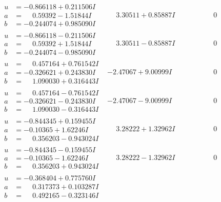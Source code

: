 \documentclass[1p]{elsarticle_modified}
\theoremstyle{definition}
\begin{document}
$$\begin{array}{c|c|c}
\begin{aligned}
u &= -0.866118 + 0.211506 I \\
a &= \phantom{-}0.59392 - 1.51844 I \\
b &= -0.244074 + 0.985090 I\end{aligned}
 & \phantom{-}3.30511 + 0.85887 I & \phantom{-0.000000 } 0 \\ \hline\begin{aligned}
u &= -0.866118 - 0.211506 I \\
a &= \phantom{-}0.59392 + 1.51844 I \\
b &= -0.244074 - 0.985090 I\end{aligned}
 & \phantom{-}3.30511 - 0.85887 I & \phantom{-0.000000 } 0 \\ \hline\begin{aligned}
u &= \phantom{-}0.457164 + 0.761542 I \\
a &= -0.326621 + 0.243830 I \\
b &= \phantom{-}1.090030 + 0.316443 I\end{aligned}
 & -2.47067 + 9.00999 I & \phantom{-0.000000 } 0 \\ \hline\begin{aligned}
u &= \phantom{-}0.457164 - 0.761542 I \\
a &= -0.326621 - 0.243830 I \\
b &= \phantom{-}1.090030 - 0.316443 I\end{aligned}
 & -2.47067 - 9.00999 I & \phantom{-0.000000 } 0 \\ \hline\begin{aligned}
u &= -0.844345 + 0.159455 I \\
a &= -0.10365 + 1.62246 I \\
b &= \phantom{-}0.356203 - 0.943024 I\end{aligned}
 & \phantom{-}3.28222 + 1.32962 I & \phantom{-0.000000 } 0 \\ \hline\begin{aligned}
u &= -0.844345 - 0.159455 I \\
a &= -0.10365 - 1.62246 I \\
b &= \phantom{-}0.356203 + 0.943024 I\end{aligned}
 & \phantom{-}3.28222 - 1.32962 I & \phantom{-0.000000 } 0 \\ \hline\begin{aligned}
u &= -0.368404 + 0.775760 I \\
a &= \phantom{-}0.317373 + 0.103287 I \\
b &= \phantom{-}0.492165 - 0.323146 I\end{aligned}

\end{array}$$
\end{document}
